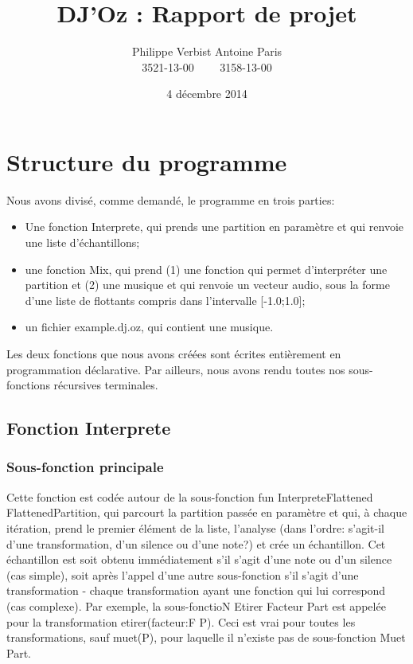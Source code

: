 \documentclass[12pt,a4paper]{article}
\author{Philippe Verbist  Antoine Paris\\3521-13-00 \ \ \ \ 3158-13-00}
\title{DJ'Oz : Rapport de projet}
\date{4 décembre 2014}
\begin{document}
\maketitle


\section{Structure du programme}
Nous avons divisé, comme demandé, le programme en trois parties:
\begin{itemize}
	\item Une fonction Interprete, qui prends une partition en 	paramètre et qui renvoie une liste d'échantillons;
	\item une fonction Mix, qui prend (1) une fonction qui permet d'interpréter une partition  et (2) une musique et qui renvoie un vecteur audio, sous la forme d'une liste de flottants compris dans l'intervalle [-1.0;1.0];
	\item un fichier example.dj.oz, qui contient une musique.
\end{itemize}

Les deux fonctions que nous avons créées sont écrites entièrement en programmation déclarative. Par ailleurs, nous avons rendu toutes nos sous-fonctions récursives terminales.

\subsection{Fonction Interprete}
\subsubsection{Sous-fonction principale}
Cette fonction est codée autour de la sous-fonction fun {InterpreteFlattened FlattenedPartition},
 qui parcourt la partition passée en paramètre et qui, à chaque itération, prend le premier
élément de la liste, l'analyse (dans l'ordre: s'agit-il d'une transformation, d'un silence ou d'une note?)
 et crée un échantillon. Cet échantillon est soit obtenu immédiatement s'il s'agit d'une note ou d'un
silence (cas simple), soit après l'appel d'une autre sous-fonction s'il s'agit d'une transformation -
chaque transformation ayant une fonction qui lui correspond (cas complexe). Par exemple, la sous-fonctioN
{Etirer Facteur Part} est appelée pour la transformation etirer(facteur:F P). Ceci est vrai pour toutes
les transformations, sauf muet(P), pour laquelle il n'existe pas de sous-fonction {Muet Part}.
\end{document}
